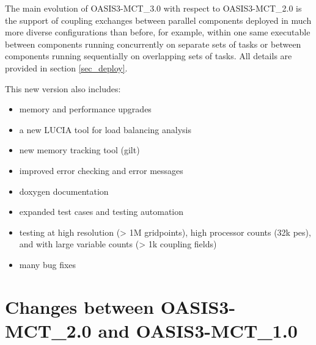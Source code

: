 The main evolution of OASIS3-MCT\_3.0 with respect to OASIS3-MCT\_2.0 is the support of coupling exchanges between parallel components deployed in much more diverse configurations than before, for example, within one same executable between components running concurrently on separate sets of tasks or between components running sequentially on overlapping sets of tasks. All details are provided in section \ref{sec_deploy}.

This new version also includes:
\begin{itemize}
\item memory and performance upgrades
\item a new LUCIA tool for load balancing analysis
\item new memory tracking tool (gilt)
\item improved error checking and error messages
\item doxygen documentation
\item expanded test cases and testing automation
\item testing at high resolution (> 1M gridpoints), high processor counts (32k pes), and with large variable counts (> 1k coupling fields)
\item many bug fixes
\end{itemize}

\section{Changes between OASIS3-MCT\_2.0 and OASIS3-MCT\_1.0}
\label{sec_oa1_oa2}

